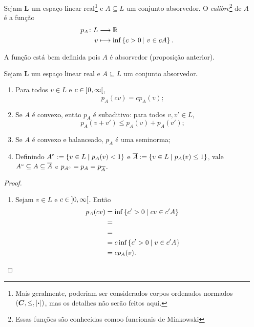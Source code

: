 \begin{definition}
Sejam $\bm L$ um espaço linear real\footnote{Mais geralmente, poderiam ser considerados corpos ordenados normados $(\bm C,\leq,\left\vert{\bm{\cdot}}\right\vert)$, mas os detalhes não serão feitos aqui.} e $A \subseteq L$ um conjunto absorvedor. O \emph{calibre}\footnote{Essas funções são conhecidas comoo funcionais de Minkowski} de $A$ é a função
	\begin{align*}
	{p_A}\colon {L} &\longrightarrow {\mathbb{R}} \\{v} &\longmapsto \inf\left\{{c>0}\;\middle\vert\;{v \in cA}\right\}.
	\end{align*}
\end{definition}

A função está bem definida pois $A$ é absorvedor (proposição anterior).

\begin{proposition}
Sejam $\bm L$ um espaço linear real e $A \subseteq L$ um conjunto absorvedor.
	\begin{enumerate}
	\item Para todos $v \in L$ e $c \in \left]{0},{\infty}\right[$,
		\begin{equation*}
		p_A(cv) = c p_A(v);
		\end{equation*}
	\item Se $A$ é convexo, então $p_A$ é subaditivo: para todos $v,v' \in L$,
		\begin{equation*}
		p_A(v+v') \leq p_A(v) + p_{A}(v');
		\end{equation*}
	\item Se $A$ é convexo e balanceado, $p_A$ é uma seminorma;
	\item Definindo ${A}^\circ := \left\{{v \in L}\;\middle\vert\;{p_A(v) < 1}\right\}$ e $\overline{A} := \left\{{v \in L}\;\middle\vert\;{p_A(v) \leq 1}\right\}$, vale ${A}^\circ \subseteq A \subseteq \overline{A}$ e $p_{{A}^\circ} = p_{A} = p_{\overline{A}}$.
	\end{enumerate}
\end{proposition}
\begin{proof}
	\begin{enumerate}
	\item Sejam $v \in L$ e $c \in \left]{0},{\infty}\right[$. Então
		\begin{align*}
		p_A(cv) &= \inf\left\{{c'>0}\;\middle\vert\;{cv \in c'A}\right\} \\
					&= \\
					&= \\
					&= c\inf\left\{{c'>0}\;\middle\vert\;{v \in c'A}\right\} \\
					&= c p_A(v).
		\end{align*}
	\end{enumerate}
\end{proof}








